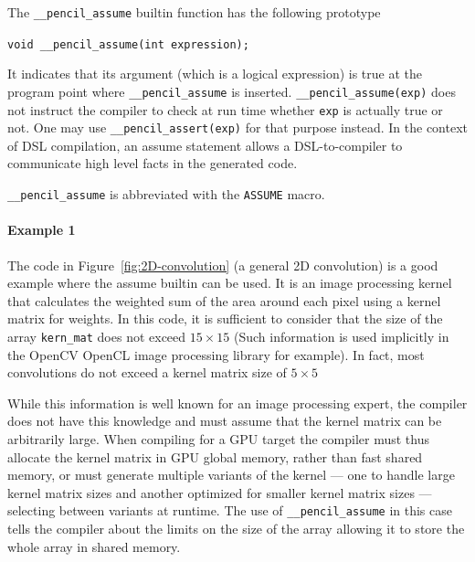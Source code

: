 The \lstinline!__pencil_assume! builtin function has the following prototype

  \lstinline!void __pencil_assume(int expression);!

  It indicates that its argument (which is a logical expression) is true at
  the program point where \lstinline!__pencil_assume! is inserted.
  \lstinline!__pencil_assume(exp)! does not instruct the compiler to check at
  run time whether \lstinline!exp! is actually true or not.
  One may use \lstinline!__pencil_assert(exp)! for that purpose instead.
  In the context of DSL compilation, an assume statement allows a
  DSL-to-\pencil compiler to communicate high level facts in the generated
  code.

  \lstinline!__pencil_assume! is abbreviated with the \lstinline!ASSUME! macro.
  
\paragraph{Example 1}
The code in Figure~\ref{fig:2D-convolution} (a general 2D convolution)  is a
good example where the assume builtin can be used.  It is an image
processing kernel that calculates the weighted sum of the area around each
pixel using a kernel matrix for weights.
In this code, it is sufficient to consider that the size of the array
\lstinline!kern_mat! does not exceed $15\times15$ (Such information is
used implicitly in the OpenCV OpenCL image processing library for example).
In fact, most convolutions do not exceed a kernel matrix size of $5\times5$

While this information is well known for an image processing expert, the
compiler does not have this knowledge and must assume that the kernel matrix
can be arbitrarily large.  When compiling for a GPU  target the compiler must
thus allocate the kernel matrix in GPU global memory, rather than fast shared
memory, or must generate multiple variants of the kernel --- one to handle large
kernel matrix sizes and another optimized for smaller kernel matrix
sizes --- selecting between variants at runtime.
The use of \lstinline!__pencil_assume! in this case tells the compiler
about the limits on the size of the array allowing it to store
the whole array in shared memory.

